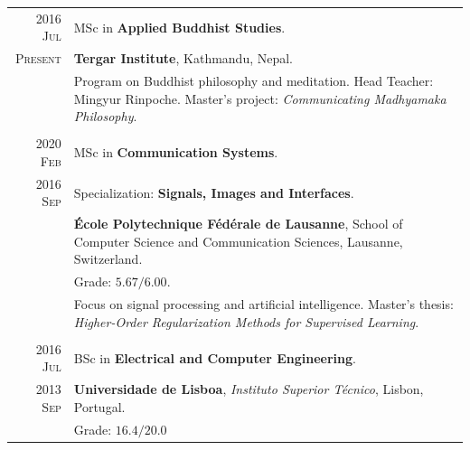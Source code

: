 \documentclass[a4paper,11pt]{article}
\begin{document}
    \begin{tabular}{r|p{13cm}}

      \textsc{\phantom{5}2016 Jul} &
      MSc in \textbf{Applied Buddhist Studies}. \\
      \textsc{Present} &  \footnotesize{\textbf{Tergar Institute}, Kathmandu, Nepal.} \\
      & \footnotesize{
        Program on Buddhist philosophy and meditation. Head Teacher: Mingyur Rinpoche.
        Master's project: \emph{Communicating Madhyamaka Philosophy}.
      } \\
      \multicolumn{2}{c}{} \\


      \textsc{2020 Feb}  &
      MSc in \textbf{Communication Systems}. \\
      \textsc{2016 Sep} & Specialization: \textbf{Signals, Images and Interfaces}. \\
      & \footnotesize{\textbf{École Polytechnique Fédérale de Lausanne}, School of Computer Science and Communication Sciences, Lausanne, Switzerland.} \\
      & \footnotesize{
      Grade: $\bm{5.67/6.00}$.} \\
      & \footnotesize{
        Focus on signal processing and artificial intelligence.
        Master's thesis: \emph{Higher-Order Regularization Methods for Supervised Learning}. 
      } \\
      \multicolumn{2}{c}{} \\

      \textsc{\phantom{5}2016 Jul} &
      BSc in \textbf{Electrical and Computer Engineering}. \\
      \textsc{2013 Sep} &  \footnotesize{\textbf{Universidade de Lisboa}, \emph{Instituto Superior Técnico}, Lisbon, Portugal.} \\
      & \footnotesize{Grade: $\bm{16.4/20.0}$}
    \end{tabular}


\end{document}
